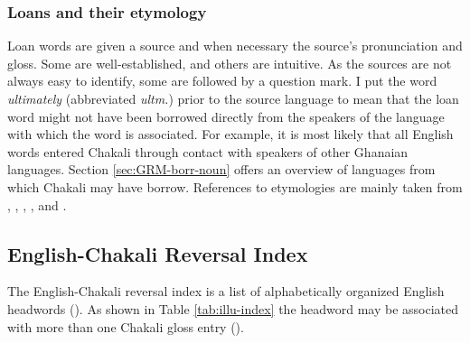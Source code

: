 % 
% 
%


\subsubsection{Loans and their etymology}
\label{sec:INT-loan-ety}


Loan words are given a source and when necessary the source's pronunciation and 
gloss. Some are well-established, and others are intuitive. As the sources are 
not 
always easy to identify, some are followed by a question mark. I  put the 
word  {\it ultimately} (abbreviated {\it ultm.}) prior to the source language
to mean that the loan word might not have been borrowed directly from the 
speakers of the language with which the word is associated. For example, it is 
most likely that all English words entered Chakali  through contact with 
speakers of other Ghanaian languages.  Section \ref{sec:GRM-borr-noun} offers an 
overview of languages from which Chakali may have borrow.  References to 
etymologies are mainly taken from \citet{newm07hausa}, \citet{daku07},  
\citet{daku09ga},  \cite{vagl80},  and  \citet{Dume11}.


\subsection{English-Chakali Reversal Index}
\label{sec:eng-cli-entry}

The English-Chakali reversal index is a list of  alphabetically organized 
English headwords (). As shown in Table 
\ref{tab:illu-index}  the headword may be 
associated with  more than one  Chakali 
gloss entry ().  



